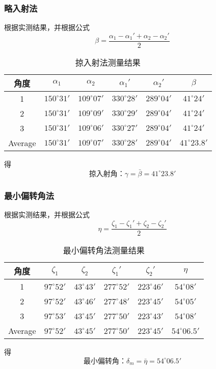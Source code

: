 \documentclass{ctexart}
\begin{document}
  \subsubsection{略入射法}
  根据实测结果，并根据公式$$\beta=\frac{\alpha_1-\alpha_1'+\alpha_2-\alpha_2'}{2}$$
\begin{table}[H]
    \centering
    \caption{掠入射法测量结果}
      \begin{tabular}{|c|c|c|c|c|c|}
        \hline
      角度    & {$\alpha_1$} & {$\alpha_2$} & {$\alpha_1'$} & {$\alpha_2'$} & {$\beta$} \\
      \hline
      {1} & $150^\circ 31'$ & $109^\circ 07'$ & $330^\circ 28'$ & $289^\circ 04'$ & $41^\circ 24'$ \\
      \hline
      {2} & $150^\circ 31'$ & $109^\circ 09'$ & $330^\circ 29'$ & $289^\circ 04'$ & $41^\circ 24'$ \\
      \hline
      {3} & $150^\circ 31'$ & $109^\circ 06'$ & $330^\circ 27'$ & $289^\circ 04'$ & $41^\circ 24'$ \\
      \hline
      Average & $150^\circ 31'$ & $109^\circ 07'$ & $330^\circ 28'$ & $289^\circ 04'$ & $41^\circ 23.8'$ \\
    \hline  
    \end{tabular}%
    \label{tab:addlabel}%
  \end{table}%
  得$$\mbox{掠入射角：}\gamma=\bar{\beta}=41^\circ 23.8'$$
\subsubsection{最小偏转角法}
根据实测结果，并根据公式$$\eta=\frac{\zeta_1-\zeta_1'+\zeta_2-\zeta_2'}{2}$$
\begin{table}[H]
    \centering
    \caption{最小偏转角法测量结果}
      \begin{tabular}{|c|c|c|c|c|c|}
        \hline
      角度    & {$\zeta_1$} & {$\zeta_2$} & {$\zeta_1'$} & {$\zeta_2'$} & {$\eta$} \\
      \hline
      {1} & $97^\circ 52'$ & $43^\circ 43'$ & $277^\circ 52'$ & $223^\circ 46'$ & $54^\circ 08'$ \\
      \hline
      {2} & $97^\circ 52'$ & $43^\circ 46'$ & $277^\circ 48'$ & $223^\circ 45'$ & $54^\circ 05'$ \\
      \hline
      {3} & $97^\circ 53'$ & $43^\circ 45'$ & $277^\circ 50'$ & $223^\circ 43'$ & $54^\circ 08'$ \\
      \hline
      Average & $97^\circ 52'$ & $43^\circ 45'$ & $277^\circ 50'$ & $223^\circ 45'$ & $54^\circ 06.5'$ \\
      \hline
      \end{tabular}%
    \label{tab:addlabel}%
  \end{table}%
  得$$\mbox{最小偏转角：}\delta_m=\bar{\eta}=54^\circ 06.5'$$
\end{document}
